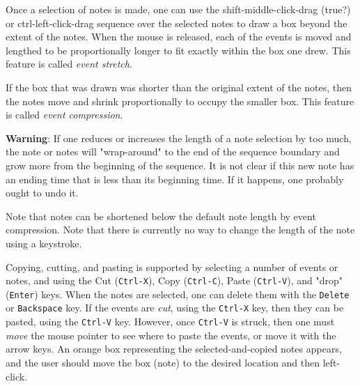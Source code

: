    Once a selection of notes is made, one can use the
   shift-middle-click-drag (true?) or ctrl-left-click-drag
   sequence over the selected notes to
   draw a box beyond the extent of the notes.  When the mouse is released,
   each of the events is moved and lengthed to be proportionally longer to
   fit exactly within the box one drew.
   This feature is called \textsl{event stretch}.

   If the box that was drawn was shorter than the original extent of the
   notes, then the notes move and shrink proportionally to occupy the
   smaller box.
   This feature is called \textsl{event compression}.
   
   \textbf{Warning}:  If one reduces or increases the length of a note selection
   by too much, the note or notes will "wrap-around" to the end of the sequence
   boundary and grow more from the beginning of the sequence. 
   It is not clear if this new note has an ending time that is less than its
   beginning time.  If it happens, one probably ought to undo it.

   Note that notes can be shortened below the default note length by event
   compression.  Note that there is currently no way to change the length of
   the note using a keystroke.

   Copying, cutting, and pasting is supported by selecting a number of events
   or notes, and using the
    Cut (\texttt{Ctrl-X}), 
    Copy (\texttt{Ctrl-C}),
    Paste (\texttt{Ctrl-V}), and
   "drop" (\texttt{Enter})
   keys.
   When the notes are selected,
   one can delete them with the \texttt{Delete} or \texttt{Backspace} key.
   If the events are \textsl{cut}, using the \texttt{Ctrl-X} key, then
   they can be pasted, using the \texttt{Ctrl-V} key.  However,
   once \texttt{Ctrl-V} is struck, then one must \textsl{move} the mouse
   pointer to see where to paste the events, or move it with the arrow keys.
   An orange box representing the
   selected-and-copied notes appears, and the user should move the box (note)
   to the desired location and then left-click.

